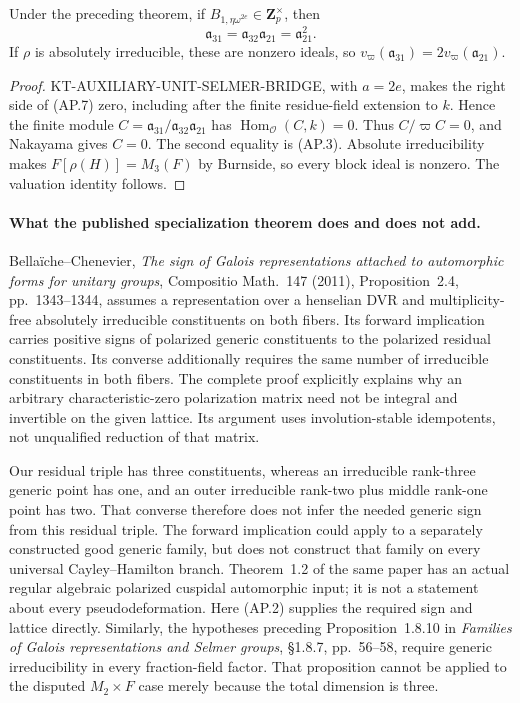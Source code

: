 \begin{corollary}
Under the preceding theorem, if
$B_{1,\eta\omega^{2e}}\in\mathbf Z_p^\times$, then
\[
              \mathfrak a_{31}
                =\mathfrak a_{32}\mathfrak a_{21}
                =\mathfrak a_{21}^{2}.                     \tag{AP.12}
\]
If $\rho$ is absolutely irreducible, these are nonzero ideals,
so $v_\varpi(\mathfrak a_{31})=2v_\varpi(\mathfrak a_{21})$.
\end{corollary}
\begin{proof}
KT-AUXILIARY-UNIT-SELMER-BRIDGE, with $a=2e$, makes
the right side of (AP.7) zero, including after the finite
residue-field extension to $k$.  Hence the finite module
$C=\mathfrak a_{31}/\mathfrak a_{32}\mathfrak a_{21}$
has $\operatorname{Hom}_{\mathcal O}(C,k)=0$.
Thus $C/\varpi C=0$, and Nakayama gives $C=0$.
The second equality is (AP.3).  Absolute irreducibility
makes $F[\rho(H)]=M_3(F)$ by Burnside, so every block
ideal is nonzero.  The valuation identity follows.
\end{proof}

\paragraph{What the published specialization theorem does and does not add.}
Bella\"iche--Chenevier, \emph{The sign of Galois representations
attached to automorphic forms for unitary groups},
Compositio Math.\ 147 (2011), Proposition~2.4, pp.~1343--1344,
assumes a representation over a henselian DVR and
multiplicity-free absolutely irreducible constituents on
both fibers.  Its forward implication carries positive
signs of polarized generic constituents to the polarized
residual constituents.  Its converse additionally requires
the same number of irreducible constituents in both fibers.
The complete proof explicitly explains why an arbitrary
characteristic-zero polarization matrix need not be integral
and invertible on the given lattice.  Its argument uses
involution-stable idempotents, not unqualified reduction of
that matrix.

Our residual triple has three constituents, whereas an
irreducible rank-three generic point has one, and an outer
irreducible rank-two plus middle rank-one point has two.
That converse therefore does not infer the needed generic
sign from this residual triple.  The forward implication
could apply to a separately constructed good generic family,
but does not construct that family on every universal
Cayley--Hamilton branch.  Theorem~1.2 of the same paper has
an actual regular algebraic polarized cuspidal automorphic
input; it is not a statement about every pseudodeformation.
Here (AP.2) supplies the required sign and lattice directly.
Similarly, the hypotheses preceding Proposition~1.8.10 in
\emph{Families of Galois representations and Selmer groups},
\S1.8.7, pp.~56--58, require generic irreducibility in
every fraction-field factor.  That proposition cannot be
applied to the disputed $M_2\times F$ case merely because
the total dimension is three.

